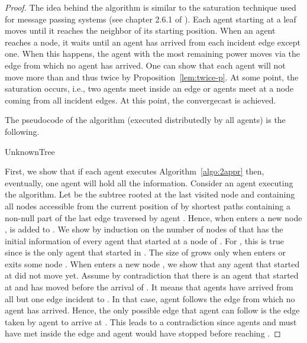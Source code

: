 \documentclass{article}
\begin{document}
\begin{proof}
The idea behind the algorithm is similar to the saturation technique used for message passing systems (see chapter 2.6.1 of \cite{San}). Each agent starting at a leaf moves until it reaches the neighbor of its starting position. When an agent reaches a node, it waits until an agent has arrived from each incident edge except one. When this happens, the agent with the most remaining power moves via the edge from which no agent has arrived. One can show that each agent will not move more than  and thus twice  by Proposition~\ref{lem:twice-p}. At some point, the saturation occurs, i.e., two agents meet inside an edge or agents meet at a node coming from all incident edges. At this point, the convergecast is achieved.

The pseudocode of the algorithm (executed distributedly by all agents) is the following.

\begin{algorithm}[H]
\caption{UnknownTree \label{algo:2appr}}
 \;
 \While{}
 {\;
	{}
	{\;
	}
	\lElse
	{} 
 }
\end{algorithm}


 First, we show that if each agent executes Algorithm~\ref{algo:2appr} then, eventually, one agent will hold all the information. Consider an agent  executing the algorithm. Let  be the subtree rooted at the last visited node and containing all nodes accessible from the current position of  by shortest paths containing a non-null part of the last edge traversed by agent . Hence, when  enters a new node ,  is added to . We show by induction on the number of nodes of  that  has the initial information of every agent that started at a node of . For , this is true since  is the only agent that started in . The size of  grows only when  enters or exits some node . When  enters a new node , we show that any agent that started at  did not move yet. Assume by contradiction that there is an agent  that started at  and has moved before the arrival of . It means that agents have arrived from all but one edge incident to . In that case, agent  follows the edge from which no agent has arrived. Hence, the only possible edge that agent  can follow is the edge taken by agent  to arrive at . This leads to a contradiction since agents  and  must have met inside the edge and agent  would have stopped before reaching .
 

\end{proof}
\end{document}
